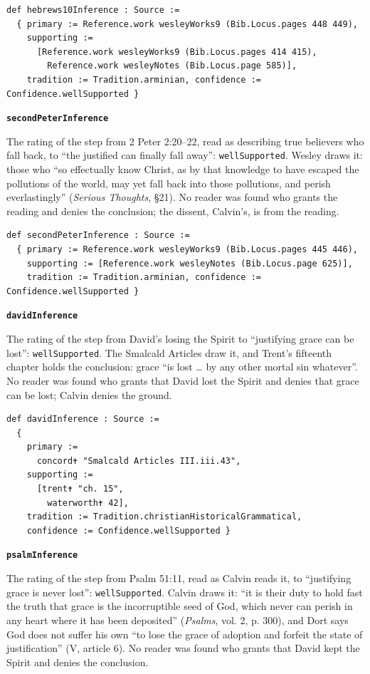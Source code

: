 \documentclass[11pt]{article}
\begin{document}
{\small\begin{verbatim}
def hebrews10Inference : Source :=
  { primary := Reference.work wesleyWorks9 (Bib.Locus.pages 448 449),
    supporting :=
      [Reference.work wesleyWorks9 (Bib.Locus.pages 414 415),
        Reference.work wesleyNotes (Bib.Locus.page 585)],
    tradition := Tradition.arminian, confidence := Confidence.wellSupported }
\end{verbatim}}
\par\medskip\noindent\textbf{\texttt{second\allowbreak{}Peter\allowbreak{}Inference}}\par\nobreak\noindent
The rating of the step from 2 Peter 2:20–22, read as describing true believers who fall back, to “the justified can finally fall away”: \texttt{well\allowbreak{}Supported}. Wesley draws it: those who “so effectually know Christ, as by that knowledge to have escaped the pollutions of the world, may yet fall back into those pollutions, and perish everlastingly” (\emph{Serious Thoughts}, §21). No reader was found who grants the reading and denies the conclusion; the dissent, Calvin’s, is from the reading.

{\small\begin{verbatim}
def secondPeterInference : Source :=
  { primary := Reference.work wesleyWorks9 (Bib.Locus.pages 445 446),
    supporting := [Reference.work wesleyNotes (Bib.Locus.page 625)],
    tradition := Tradition.arminian, confidence := Confidence.wellSupported }
\end{verbatim}}
\par\medskip\noindent\textbf{\texttt{david\allowbreak{}Inference}}\par\nobreak\noindent
The rating of the step from David’s losing the Spirit to “justifying grace can be lost”: \texttt{well\allowbreak{}Supported}. The Smalcald Articles draw it, and Trent’s fifteenth chapter holds the conclusion: grace “is lost … by any other mortal sin whatever”. No reader was found who grants that David lost the Spirit and denies that grace can be lost; Calvin denies the ground.

{\small\begin{verbatim}
def davidInference : Source :=
  {
    primary :=
      concord✝ "Smalcald Articles III.iii.43",
    supporting :=
      [trent✝ "ch. 15",
        waterworth✝ 42],
    tradition := Tradition.christianHistoricalGrammatical,
    confidence := Confidence.wellSupported }
\end{verbatim}}
\par\medskip\noindent\textbf{\texttt{psalm\allowbreak{}Inference}}\par\nobreak\noindent
The rating of the step from Psalm 51:11, read as Calvin reads it, to “justifying grace is never lost”: \texttt{well\allowbreak{}Supported}. Calvin draws it: “it is their duty to hold fast the truth that grace is the incorruptible seed of God, which never can perish in any heart where it has been deposited” (\emph{Psalms}, vol. 2, p. 300), and Dort says God does not suffer his own “to lose the grace of adoption and forfeit the state of justification” (V, article 6). No reader was found who grants that David kept the Spirit and denies the conclusion.
\end{document}
